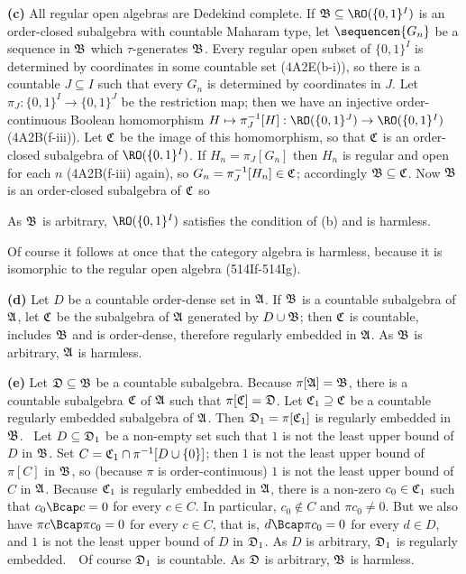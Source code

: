 {\medskip

{\bf (c)} All regular open algebras are Dedekind complete.
If $\frak B\subseteq\RO(\{0,1\}^I)$ is an order-closed subalgebra with
countable
Maharam type, let $\sequencen{G_n}$ be a sequence in $\frak B$ which
$\tau$-generates $\frak B$.   Every regular open subset of $\{0,1\}^I$ is
determined by coordinates in some countable set (4A2E(b-i)), so there is a
countable $J\subseteq I$ such that every $G_n$ is determined by coordinates
in $J$.   Let $\pi_J:\{0,1\}^I\to\{0,1\}^J$ be the restriction map;  then
we have an injective order-continuous Boolean homomorphism
$H\mapsto\pi_J^{-1}[H]:\RO(\{0,1\}^J)\to\RO(\{0,1\}^I)$
(4A2B(f-iii)).   Let $\frak C$ be the
image of this homomorphism, so that $\frak C$ is an order-closed subalgebra of
$\RO(\{0,1\}^I)$.   If $H_n=\pi_J[G_n]$
then $H_n$ is regular and open for each $n$ (4A2B(f-iii) again), so
$G_n=\pi_J^{-1}[H_n]\in\frak C$;  accordingly $\frak B\subseteq\frak C$.   Now
$\frak B$ is an order-closed subalgebra of $\frak C$ so


\noindent As $\frak B$ is arbitrary, $\RO(\{0,1\}^I)$ satisfies the 
condition of (b) and is harmless.

Of course it follows at once that the category algebra is harmless, because
it is isomorphic to the regular open algebra (514If-514Ig).

\medskip

{\bf (d)} Let $D$ be a countable order-dense set in $\frak A$.   If $\frak B$ is a
countable subalgebra of $\frak A$, let $\frak C$ be the subalgebra of $\frak A$
generated by $D\cup\frak B$;  then $\frak C$ is countable, includes $\frak B$ and is
order-dense, therefore regularly embedded in $\frak A$.   As $\frak B$ is arbitrary,
$\frak A$ is harmless.

\medskip

{\bf (e)} Let $\frak D\subseteq\frak B$ be a countable subalgebra.   Because
$\pi[\frak A]=\frak B$, there is a countable subalgebra $\frak C$ of $\frak A$ such
that $\pi[\frak C]=\frak D$.   Let $\frak C_1\supseteq\frak C$ be a countable
regularly embedded subalgebra of $\frak A$.   Then
$\frak D_1=\pi[\frak C_1]$ is regularly
embedded in $\frak B$.   \Prf\ Let $D\subseteq\frak D_1$ be a non-empty set such
that $1$ is not the least upper bound of $D$ in $\frak B$.   Set
$C=\frak C_1\cap\pi^{-1}[D\cup\{0\}]$;  then $1$ is not the least upper bound of
$\pi[C]$ in $\frak B$, so (because $\pi$ is order-continuous)
$1$ is not the least upper bound of $C$ in $\frak A$.
Because $\frak C_1$ is regularly embedded in $\frak A$, there is a non-zero
$c_0\in\frak C_1$ such that $c_0\Bcap c=0$ for every $c\in C$.   In particular,
$c_0\notin C$ and $\pi c_0\ne 0$.   But we also have $\pi c\Bcap\pi c_0=0$ for every
$c\in C$, that is, $d\Bcap\pi c_0=0$ for every $d\in D$, and $1$ is not the least
upper bound of $D$ in $\frak D_1$.   As $D$ is arbitrary, $\frak D_1$ is regularly
embedded.\ \QeD\   Of course $\frak D_1$ is countable.   As $\frak D$ is arbitrary,
$\frak B$ is harmless.

}
